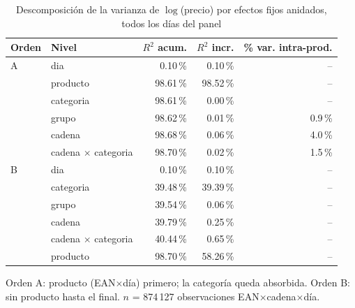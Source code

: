 \begin{table}[htbp]
\caption{Descomposici\'on de la varianza de $\log$(precio) por efectos fijos anidados, todos los d\'ias del panel}
\label{tab:varianza}
\centering\scriptsize\setlength{\tabcolsep}{3pt}
\begin{tabular}{@{}llrrr@{}}
\toprule
Orden & Nivel & $R^2$ acum. & $R^2$ incr. & \% var. intra-prod. \\
\midrule
A & dia & 0.10\,\% & 0.10\,\% & -- \\
 & producto & 98.61\,\% & 98.52\,\% & -- \\
 & categoria & 98.61\,\% & 0.00\,\% & -- \\
 & grupo & 98.62\,\% & 0.01\,\% & 0.9\,\% \\
 & cadena & 98.68\,\% & 0.06\,\% & 4.0\,\% \\
 & cadena $\times$ categoria & 98.70\,\% & 0.02\,\% & 1.5\,\% \\
\midrule
B & dia & 0.10\,\% & 0.10\,\% & -- \\
 & categoria & 39.48\,\% & 39.39\,\% & -- \\
 & grupo & 39.54\,\% & 0.06\,\% & -- \\
 & cadena & 39.79\,\% & 0.25\,\% & -- \\
 & cadena $\times$ categoria & 40.44\,\% & 0.65\,\% & -- \\
 & producto & 98.70\,\% & 58.26\,\% & -- \\
\bottomrule\end{tabular}
\par\smallskip\raggedright\scriptsize Orden A: producto (EAN$\times$d\'ia) primero; la categor\'ia queda absorbida. Orden B: sin producto hasta el final. $n$ = 874\,127 observaciones EAN$\times$cadena$\times$d\'ia.
\end{table}

